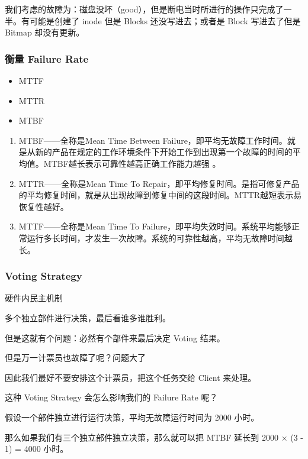 \documentclass[
]{article}
\begin{document}
我们考虑的故障为：磁盘没坏（good），但是断电当时所进行的操作只完成了一半。有可能是创建了
inode 但是 Blocks 还没写进去；或者是 Block 写进去了但是 Bitmap
却没有更新。

\hypertarget{header-n19}{%
\subsubsection{衡量 Failure Rate}\label{header-n19}}

\begin{itemize}
\item
  MTTF
\item
  MTTR
\item
  MTBF
\end{itemize}

\begin{enumerate}
\def\labelenumi{\arabic{enumi}.}
\item
  MTBF------全称是Mean Time Between
  Failure，即平均无故障工作时间。就是从新的产品在规定的工作环境条件下开始工作到出现第一个故障的时间的平均值。MTBF越长表示可靠性越高正确工作能力越强
  。
\item
  MTTR------全称是Mean Time To
  Repair，即平均修复时间。是指可修复产品的平均修复时间，就是从出现故障到修复中间的这段时间。MTTR越短表示易恢复性越好。
\item
  MTTF------全称是Mean Time To
  Failure，即平均失效时间。系统平均能够正常运行多长时间，才发生一次故障。系统的可靠性越高，平均无故障时间越长。
\end{enumerate}

\hypertarget{header-n34}{%
\subsubsection{Voting Strategy}\label{header-n34}}

硬件内民主机制

多个独立部件进行决策，最后看谁多谁胜利。

但是这就有个问题：必然有个部件来最后决定 Voting 结果。

但是万一计票员也故障了呢？问题大了

因此我们最好不要安排这个计票员，把这个任务交给 Client 来处理。

这种 Voting Strategy 会怎么影响我们的 Failure Rate 呢？

假设一个部件独立进行运行决策，平均无故障运行时间为 2000 小时。

那么如果我们有三个独立部件独立决策，那么就可以把 MTBF 延长到 2000 × (3 -
1) = 4000 小时。
\end{document}
